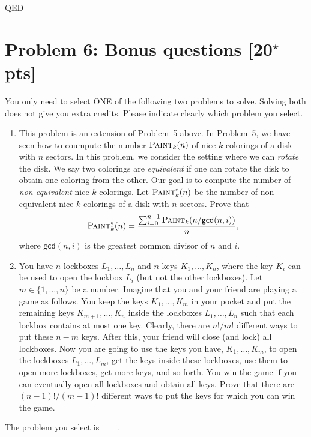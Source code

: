 \documentclass[11pt,twoside]{article}
\newcommand{\problem}[1]{\section*{Problem #1}}
\begin{document}
QED




\problem{6: Bonus questions [20$^\star$ pts]}

{\color{red} You only need to select ONE of the following two problems to solve.
Solving both does not give you extra credits.
Please indicate clearly which problem you select.}

\begin{enumerate}
    \item This problem is an extension of Problem~5 above.
    In Problem~5, we have seen how to coumpute the number $\textsc{Paint}_k(n)$ of nice $k$-colorings of a disk with $n$ sectors.
    In this problem, we consider the setting where we can \textit{rotate} the disk.
    We say two colorings are \textit{equivalent} if one can rotate the disk to obtain one coloring from the other.
    Our goal is to compute the number of \textit{non-equivalent} nice $k$-colorings.
    Let $\textsc{Paint}_k^*(n)$ be the number of non-equivalent nice $k$-colorings of a disk with $n$ sectors.
    Prove that
    \begin{equation*}
        \textsc{Paint}_k^*(n) = \frac{\sum_{i=0}^{n-1} \textsc{Paint}_k(n/\mathsf{gcd}(n,i))}{n},
    \end{equation*}
    where $\mathsf{gcd}(n,i)$ is the greatest common divisor of $n$ and $i$.
    
    \item You have $n$ lockboxes $L_1,\dots,L_n$ and $n$ keys $K_1,\dots,K_n$, where the key $K_i$ can be used to open the lockbox $L_i$ (but not the other lockboxes).
    Let $m \in \{1,\dots,n\}$ be a number.
    Imagine that you and your friend are playing a game as follows.
    You keep the keys $K_1,\dots,K_m$ in your pocket and put the remaining keys $K_{m+1},\dots,K_n$ inside the lockboxes $L_1,\dots,L_n$ such that each lockbox contains at most one key.
    Clearly, there are $n!/m!$ different ways to put these $n-m$ keys.
    After this, your friend will close (and lock) all lockboxes.
    Now you are going to use the keys you have, $K_1,\dots,K_m$, to open the lockboxes $L_1,\dots,L_m$, get the keys inside these lockboxes, use them to open more lockboxes, get more keys, and so forth.
    You win the game if you can eventually open all lockboxes and obtain all keys.
    Prove that there are $(n-1)!/(m-1)!$ different ways to put the keys for which you can win the game.
\end{enumerate}

The problem you select is $\underline{\ \ \ \ \ \ \ \ }$.
\end{document}
